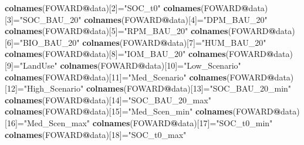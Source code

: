 \documentclass[
  10pt,
  b5paper,
]{book}
\newenvironment{Shaded}{\begin{snugshade}}{\end{snugshade}}
\newcommand{\DecValTok}[1]{\textcolor[rgb]{0.00,0.00,0.81}{#1}}
\newcommand{\KeywordTok}[1]{\textcolor[rgb]{0.13,0.29,0.53}{\textbf{#1}}}
\newcommand{\NormalTok}[1]{#1}
\newcommand{\OperatorTok}[1]{\textcolor[rgb]{0.81,0.36,0.00}{\textbf{#1}}}
\newcommand{\StringTok}[1]{\textcolor[rgb]{0.31,0.60,0.02}{#1}}
\begin{document}
\begin{Shaded}
\begin{Highlighting}[]
{\KeywordTok{colnames}\NormalTok{(FOWARD}\OperatorTok{@}\NormalTok{data)[}\DecValTok{2}\NormalTok{]=}\StringTok{"SOC_t0"}
\KeywordTok{colnames}\NormalTok{(FOWARD}\OperatorTok{@}\NormalTok{data)[}\DecValTok{3}\NormalTok{]=}\StringTok{"SOC_BAU_20"}
\KeywordTok{colnames}\NormalTok{(FOWARD}\OperatorTok{@}\NormalTok{data)[}\DecValTok{4}\NormalTok{]=}\StringTok{"DPM_BAU_20"}
\KeywordTok{colnames}\NormalTok{(FOWARD}\OperatorTok{@}\NormalTok{data)[}\DecValTok{5}\NormalTok{]=}\StringTok{"RPM_BAU_20"}
\KeywordTok{colnames}\NormalTok{(FOWARD}\OperatorTok{@}\NormalTok{data)[}\DecValTok{6}\NormalTok{]=}\StringTok{"BIO_BAU_20"}
\KeywordTok{colnames}\NormalTok{(FOWARD}\OperatorTok{@}\NormalTok{data)[}\DecValTok{7}\NormalTok{]=}\StringTok{"HUM_BAU_20"}
\KeywordTok{colnames}\NormalTok{(FOWARD}\OperatorTok{@}\NormalTok{data)[}\DecValTok{8}\NormalTok{]=}\StringTok{"IOM_BAU_20"}
\KeywordTok{colnames}\NormalTok{(FOWARD}\OperatorTok{@}\NormalTok{data)[}\DecValTok{9}\NormalTok{]=}\StringTok{"LandUse"}
\KeywordTok{colnames}\NormalTok{(FOWARD}\OperatorTok{@}\NormalTok{data)[}\DecValTok{10}\NormalTok{]=}\StringTok{"Low_Scenario"}
\KeywordTok{colnames}\NormalTok{(FOWARD}\OperatorTok{@}\NormalTok{data)[}\DecValTok{11}\NormalTok{]=}\StringTok{"Med_Scenario"}
\KeywordTok{colnames}\NormalTok{(FOWARD}\OperatorTok{@}\NormalTok{data)[}\DecValTok{12}\NormalTok{]=}\StringTok{"High_Scenario"}
\KeywordTok{colnames}\NormalTok{(FOWARD}\OperatorTok{@}\NormalTok{data)[}\DecValTok{13}\NormalTok{]=}\StringTok{"SOC_BAU_20_min"}
\KeywordTok{colnames}\NormalTok{(FOWARD}\OperatorTok{@}\NormalTok{data)[}\DecValTok{14}\NormalTok{]=}\StringTok{"SOC_BAU_20_max"}
\KeywordTok{colnames}\NormalTok{(FOWARD}\OperatorTok{@}\NormalTok{data)[}\DecValTok{15}\NormalTok{]=}\StringTok{"Med_Scen_min"}
\KeywordTok{colnames}\NormalTok{(FOWARD}\OperatorTok{@}\NormalTok{data)[}\DecValTok{16}\NormalTok{]=}\StringTok{"Med_Scen_max"}
\KeywordTok{colnames}\NormalTok{(FOWARD}\OperatorTok{@}\NormalTok{data)[}\DecValTok{17}\NormalTok{]=}\StringTok{"SOC_t0_min"}
\KeywordTok{colnames}\NormalTok{(FOWARD}\OperatorTok{@}\NormalTok{data)[}\DecValTok{18}\NormalTok{]=}\StringTok{"SOC_t0_max"}



}
\end{Highlighting}
\end{Shaded}
\end{document}
